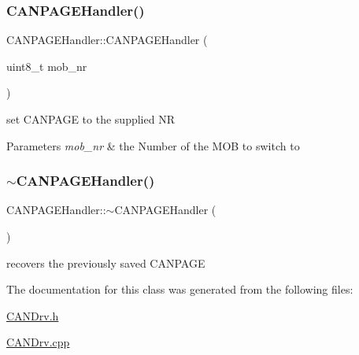 \subsubsection{\texorpdfstring{C\+A\+N\+P\+A\+G\+E\+Handler()}{CANPAGEHandler()}}
{\footnotesize\ttfamily C\+A\+N\+P\+A\+G\+E\+Handler\+::\+C\+A\+N\+P\+A\+G\+E\+Handler (\begin{DoxyParamCaption}\item[{uint8\+\_\+t}]{mob\+\_\+nr }\end{DoxyParamCaption})}



set C\+A\+N\+P\+A\+GE to the supplied NR 


\begin{DoxyParams}{Parameters}
{\em mob\+\_\+nr} & the Number of the M\+OB to switch to \\
\hline
\end{DoxyParams}
\hypertarget{class_c_a_n_p_a_g_e_handler_ae3b23150582048c8f1a8126a3c06049a}{}\label{class_c_a_n_p_a_g_e_handler_ae3b23150582048c8f1a8126a3c06049a} 
\subsubsection{\texorpdfstring{$\sim$\+C\+A\+N\+P\+A\+G\+E\+Handler()}{~CANPAGEHandler()}}
{\footnotesize\ttfamily C\+A\+N\+P\+A\+G\+E\+Handler\+::$\sim$\+C\+A\+N\+P\+A\+G\+E\+Handler (\begin{DoxyParamCaption}{ }\end{DoxyParamCaption})}



recovers the previously saved C\+A\+N\+P\+A\+GE 



The documentation for this class was generated from the following files\+:\begin{DoxyCompactItemize}
\item 
\hyperlink{_c_a_n_drv_8h}{C\+A\+N\+Drv.\+h}\item 
\hyperlink{_c_a_n_drv_8cpp}{C\+A\+N\+Drv.\+cpp}\end{DoxyCompactItemize}

